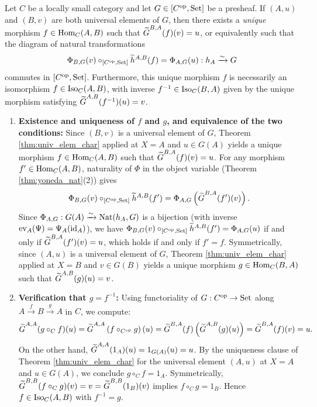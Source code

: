 \documentclass[10pt,a4paper]{article}
\begin{document}
\begin{theorem}\label{thm:rep_unique}
Let $C$ be a locally small category and let $G \in [C^{\textrm{op}}, {\textrm{Set}}]$ be a presheaf. If $(A, u)$ and $(B, v)$ are both universal elements of $G$, then there exists a \emph{unique} morphism $f \in {\textrm{Hom}}_C(A, B)$ such that ${\widetilde{G}\textrm{}}^{B,A}(f)(v) = u$, or equivalently such that the diagram of natural transformations
$$\Phi_{B,G}(v) \circ_{[C^{\textrm{op}},{\textrm{Set}}]} \widetilde{h}^{A,B}(f) = \Phi_{A,G}(u) : h_A \xrightarrow{\sim} G$$
commutes in $[C^{\textrm{op}}, {\textrm{Set}}]$. Furthermore, this unique morphism $f$ is necessarily an isomorphism $f \in {\mathrm{Iso}}_C(A, B)$, with inverse $f^{-1} \in {\mathrm{Iso}}_C(B, A)$ given by the unique morphism satisfying ${\widetilde{G}\textrm{}}^{A,B}(f^{-1})(u) = v$.
\end{theorem}
\myprf
\begin{enumerate}
\item \textbf{Existence and uniqueness of $f$ and $g$, and equivalence of the two conditions:} Since $(B, v)$ is a universal element of $G$, Theorem \ref{thm:univ_elem_char} applied at $X = A$ and $u \in G(A)$ yields a unique morphism $f \in {\textrm{Hom}}_C(A, B)$ such that ${\widetilde{G}\textrm{}}^{B,A}(f)(v) = u$. For any morphism $f' \in {\textrm{Hom}}_C(A, B)$, naturality of $\Phi$ in the object variable (Theorem \ref{thm:yoneda_nat}(2)) gives
$$\Phi_{B,G}(v) \circ_{[C^{\textrm{op}},{\textrm{Set}}]} \widetilde{h}^{A,B}(f') = \Phi_{A,G}\left({\widetilde{G}\textrm{}}^{B,A}(f')(v)\right).$$
Since $\Phi_{A,G} : G(A) \xrightarrow{\sim} {\textrm{Nat}}(h_A, G)$ is a bijection (with inverse $\mathrm{ev}_A(\Psi) = \Psi_A({\textrm{id}}_A)$), we have $\Phi_{B,G}(v) \circ_{[C^{\textrm{op}},{\textrm{Set}}]} \widetilde{h}^{A,B}(f') = \Phi_{A,G}(u)$ if and only if ${\widetilde{G}\textrm{}}^{B,A}(f')(v) = u$, which holds if and only if $f' = f$. Symmetrically, since $(A, u)$ is a universal element of $G$, Theorem \ref{thm:univ_elem_char} applied at $X = B$ and $v \in G(B)$ yields a unique morphism $g \in {\textrm{Hom}}_C(B, A)$ such that ${\widetilde{G}\textrm{}}^{A,B}(g)(u) = v$.
\item \textbf{Verification that $g = f^{-1}$:} Using functoriality of $G : C^{\textrm{op}} \to {\textrm{Set}}$ along $A \xrightarrow{f} B \xrightarrow{g} A$ in $C$, we compute:
$${\widetilde{G}\textrm{}}^{A,A}(g \circ_C f)(u) = {\widetilde{G}\textrm{}}^{A,A}\left(f \circ_{C^{\textrm{op}}} g\right)(u) = {\widetilde{G}\textrm{}}^{B,A}(f)\left({\widetilde{G}\textrm{}}^{A,B}(g)(u)\right) = {\widetilde{G}\textrm{}}^{B,A}(f)(v) = u.$$
On the other hand, ${\widetilde{G}\textrm{}}^{A,A}(1_A)(u) = 1_{G(A)}(u) = u$. By the uniqueness clause of Theorem \ref{thm:univ_elem_char} for the universal element $(A, u)$ at $X = A$ and $u \in G(A)$, we conclude $g \circ_C f = 1_A$. Symmetrically, ${\widetilde{G}\textrm{}}^{B,B}(f \circ_C g)(v) = v = {\widetilde{G}\textrm{}}^{B,B}(1_B)(v)$ implies $f \circ_C g = 1_B$. Hence $f \in {\mathrm{Iso}}_C(A, B)$ with $f^{-1} = g$.
\end{enumerate}
\myqed
\end{document}
